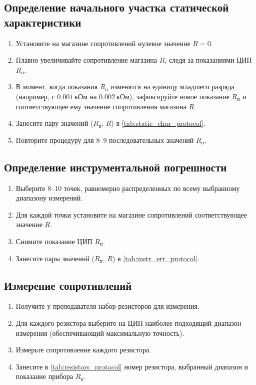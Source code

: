 \subsection{Определение начального участка статической характеристики}
\begin{enumerate}
    \item Установите на магазине сопротивлений нулевое значение $R=0$.
    \item Плавно увеличивайте сопротивление магазина $R$, следя за показаниями ЦИП $R_\text{п}$.
    \item В момент, когда показания $R_\text{п}$ изменятся на единицу младшего разряда (например, с $0.001~\text{кОм}$ на $0.002~\text{кОм}$), зафиксируйте новое показание $R_\text{п}$ и соответствующее ему значение сопротивления магазина $R$.
    \item Занесите пару значений ($R_\text{п}$, $R$) в \cref{tab:static_char_protocol}.
    \item Повторите процедуру для 8--9 последовательных значений $R_\text{п}$.
\end{enumerate}

\subsection{Определение инструментальной погрешности}
\begin{enumerate}
    \item Выберите 8--10 точек, равномерно распределенных по всему выбранному диапазону измерений.
    \item Для каждой точки установите на магазине сопротивлений соответствующее значение $R$.
    \item Снимите показание ЦИП $R_\text{п}$.
    \item Занесите пары значений ($R_\text{п}$, $R$) в \cref{tab:instr_err_protocol}.
\end{enumerate}

\subsection{Измерение сопротивлений}
\begin{enumerate}
    \item Получите у преподавателя набор резисторов для измерения.
    \item Для каждого резистора выберите на ЦИП наиболее подходящий диапазон измерения (обеспечивающий максимальную точность).
    \item Измерьте сопротивление каждого резистора.
    \item Занесите в \cref{tab:resistors_protocol} номер резистора, выбранный диапазон и показание прибора $R_\text{п}$.
\end{enumerate}

